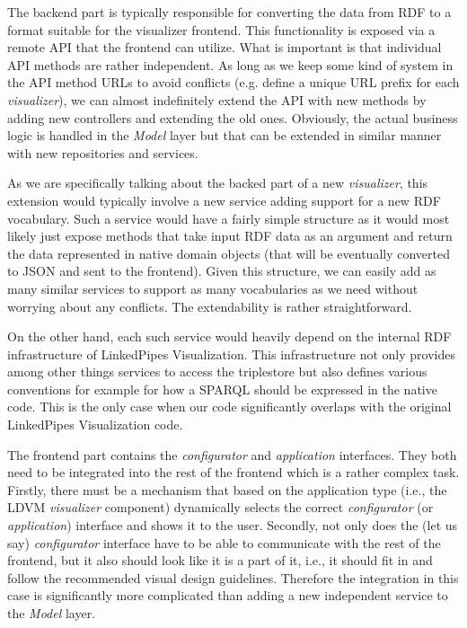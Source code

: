 The backend part is typically responsible for converting the data from RDF to a format suitable for the visualizer frontend. This functionality is exposed via a remote API that the frontend can utilize. What is important is that individual API methods are rather independent. As long as we keep some kind of system in the API method URLs to avoid conflicts (e.g. define a unique URL prefix for each \emph{visualizer}), we can almost indefinitely extend the API with new methods by adding new controllers and extending the old ones. Obviously, the actual business logic is handled in the \emph{Model} layer but that can be extended in similar manner with new repositories and services.

As we are specifically talking about the backed part of a new \emph{visualizer}, this extension would typically involve a new service adding support for a new RDF vocabulary.  Such a service would have a fairly simple structure as it would most likely just expose methods that take input RDF data as an argument and return the data represented in native domain objects (that will be eventually converted to JSON and sent to the frontend). Given this structure, we can easily add as many similar services to support as many vocabularies as we need without worrying about any conflicts. The extendability is rather straightforward.

On the other hand, each such service would heavily depend on the internal RDF infrastructure of LinkedPipes Visualization. This infrastructure not only provides among other things services to access the triplestore but also defines various conventions for example for how a SPARQL should be expressed in the native code. This is the only case when our code significantly overlaps with the original LinkedPipes Visualization code.

The frontend part contains the \emph{configurator} and \emph{application} interfaces. They both need to be integrated into the rest of the frontend which is a rather complex task. Firstly, there must be a mechanism that based on the application type (i.e., the LDVM \emph{visualizer} component) dynamically selects the correct \emph{configurator} (or \emph{application}) interface and shows it to the user. Secondly, not only does the (let us say) \emph{configurator} interface have to be able to communicate with the rest of the frontend, but it also should  look like it is a part of it, i.e., it should fit in and follow the recommended visual design guidelines. Therefore the integration in this case is significantly more complicated than adding a new independent service to the \emph{Model} layer.


